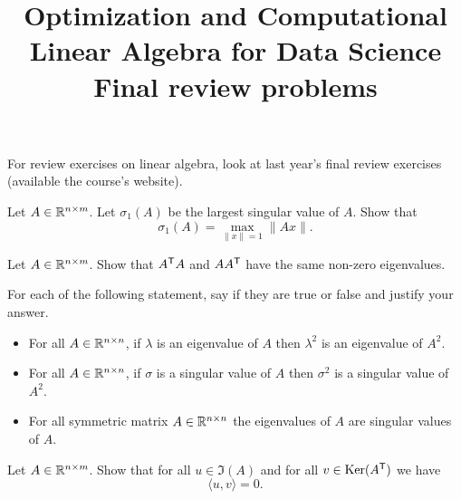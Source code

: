 \documentclass[11pt,nocut]{article}
\title{\vspace{-2.0cm}%
	Optimization and Computational Linear Algebra for Data Science\\
Final review problems}
\date{}
\begin{document}
\maketitle
%
\begin{center}
	{\Large
		For review exercises on linear algebra, look at last year's final review exercises (available the course's website).
	}
\end{center}

\vspace{1mm}

\begin{problem}
	Let $A \in \mathbb{R}^{n \times m}$. Let $\sigma_1(A)$ be the largest singular value of $A$.
	Show that
	$$
	\sigma_1(A) = \max_{\|x\|=1} \|Ax\|.
	$$
\end{problem}

\vspace{2mm}

\begin{problem}
	Let $A \in \mathbb{R}^{n \times m}$. Show that $A^{{\sf T}} A$  and $A A^{{\sf T}}$ have the same non-zero eigenvalues.
\end{problem}

\vspace{2mm}

\begin{problem}
	For each of the following statement, say if they are true or false and justify your answer.
	\begin{itemize}
		\item For all $A \in \mathbb{R}^{n \times n}$, if $\lambda$ is an eigenvalue of $A$ then $\lambda^2$ is an eigenvalue of $A^2$.
		\item For all $A \in \mathbb{R}^{n \times n}$, if $\sigma$ is a singular value of $A$ then $\sigma^2$ is a singular value of $A^2$.
		\item For all symmetric matrix $A \in \mathbb{R}^{n \times n}$ the eigenvalues of $A$ are singular values of $A$.
	\end{itemize}
\end{problem}

\begin{problem}
	Let $A \in \mathbb{R}^{n \times m}$. Show that for all $u \in \Im(A)$ and for all $v \in {{\rm Ker}}(A^{{\sf T}})$ we have
	$$
	\langle u,v \rangle = 0.
	$$
\end{problem}

\end{document}
